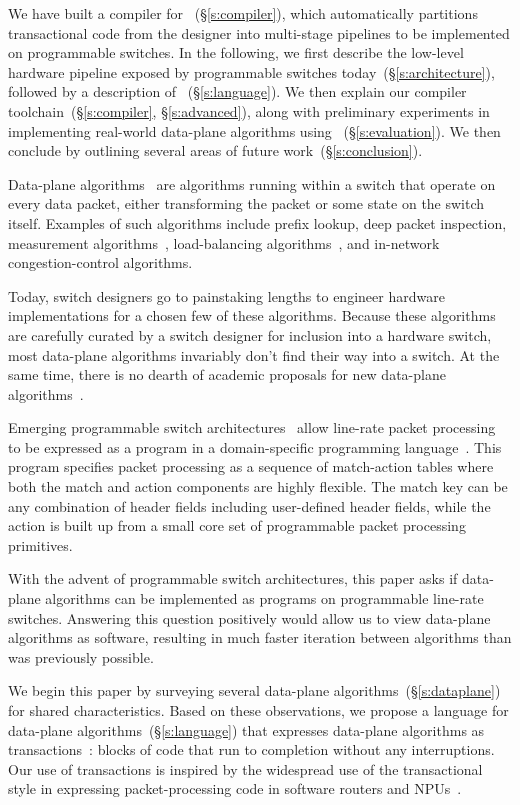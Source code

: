 We have built a compiler for \pktlanguage~(\S\ref{s:compiler}), 
which automatically partitions
transactional code from the designer into multi-stage pipelines to be implemented
on programmable switches. In the following, we first describe the low-level
hardware pipeline exposed by programmable switches today~(\S\ref{s:architecture}),
followed by a description of \pktlanguage~(\S\ref{s:language}). We then
explain our compiler toolchain~(\S\ref{s:compiler}, \S\ref{s:advanced}), 
along with preliminary
experiments in implementing real-world data-plane algorithms using \pktlanguage
~(\S\ref{s:evaluation}). We then 
conclude by outlining several areas of future work~(\S\ref{s:conclusion}).


Data-plane algorithms~\cite{cestan} are algorithms running within a switch that
operate on every data packet, either transforming the packet or some state on
the switch itself. Examples of such algorithms include prefix lookup, deep
packet inspection, measurement algorithms~\cite{minsketch}, load-balancing
algorithms~\cite{conga}, and in-network congestion-control algorithms.

Today, switch designers go to painstaking lengths to engineer hardware
implementations for a chosen few of these algorithms. Because these algorithms
are carefully curated by a switch designer for inclusion into a hardware
switch, most data-plane algorithms invariably don't find their way into a
switch. At the same time, there is no dearth of academic proposals for new
data-plane algorithms~\cite{minsketch, codel, pdq}.

Emerging programmable switch architectures~\cite{flexpipe, xpliant, rmt} allow
line-rate packet processing to be expressed as a program in a domain-specific
programming language~\cite{p4}.  This program specifies packet processing as a
sequence of match-action tables where both the match and action components are
highly flexible. The match key can be any combination of header fields
including user-defined header fields, while the action is built up from a small
core set of programmable packet processing primitives.

With the advent of programmable switch architectures, this paper asks if
data-plane algorithms can be implemented as programs on programmable line-rate
switches. Answering this question positively would allow us to view data-plane
algorithms as software, resulting in much faster iteration between algorithms
than was previously possible.

We begin this paper by surveying several data-plane
algorithms~(\S\ref{s:dataplane}) for shared characteristics. Based on these
observations, we propose a language for data-plane
algorithms~(\S\ref{s:language}) that expresses data-plane algorithms as
transactions~\cite{transactions}: blocks of code that run to completion without
any interruptions. Our use of transactions is inspired by the widespread use of
the transactional style in expressing packet-processing code in software
routers and NPUs~\cite{click, intel, qdisc}.

